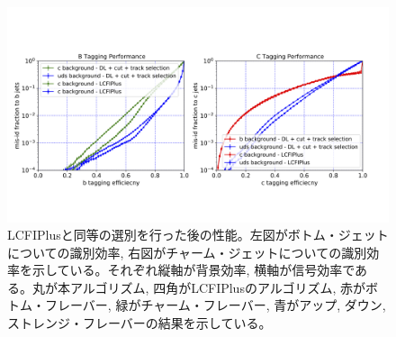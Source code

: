 \begin{figure}[htbp]
 \centering
 \includegraphics[trim = 0 150 0 200, width=1.0\textwidth, clip]{Figure/5Comparison/5-2-3-2FlavorTaggingROCCurve.png}
 \caption[LCFIPlusと同等の選別を行った後の性能]{LCFIPlusと同等の選別を行った後の性能。左図がボトム・ジェットについての識別効率, 右図がチャーム・ジェットについての識別効率を示している。それぞれ縦軸が背景効率, 横軸が信号効率である。丸が本アルゴリズム, 四角がLCFIPlusのアルゴリズム, 赤がボトム・フレーバー, 緑がチャーム・フレーバー, 青がアップ, ダウン, ストレンジ・フレーバーの結果を示している。}
 \label{5-2-3-2FlavorTaggingROCCurve}
\end{figure}












